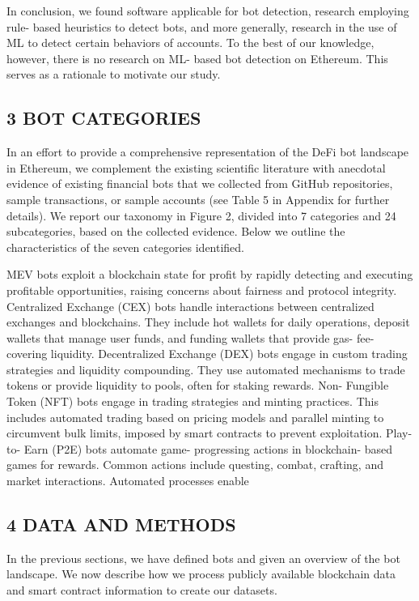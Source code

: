 In conclusion, we found software applicable for bot detection, research employing rule- based heuristics to detect bots, and more generally, research in the use of ML to detect certain behaviors of accounts. To the best of our knowledge, however, there is no research on ML- based bot detection on Ethereum. This serves as a rationale to motivate our study.

\subsection*{3 BOT CATEGORIES}

In an effort to provide a comprehensive representation of the DeFi bot landscape in Ethereum, we complement the existing scientific literature with anecdotal evidence of existing financial bots that we collected from GitHub repositories, sample transactions, or sample accounts (see Table 5 in Appendix for further details). We report our taxonomy in Figure 2, divided into 7 categories and 24 subcategories, based on the collected evidence. Below we outline the characteristics of the seven categories identified.

MEV bots exploit a blockchain state for profit by rapidly detecting and executing profitable opportunities, raising concerns about fairness and protocol integrity. Centralized Exchange (CEX) bots handle interactions between centralized exchanges and blockchains. They include hot wallets for daily operations, deposit wallets that manage user funds, and funding wallets that provide gas- fee- covering liquidity. Decentralized Exchange (DEX) bots engage in custom trading strategies and liquidity compounding. They use automated mechanisms to trade tokens or provide liquidity to pools, often for staking rewards. Non- Fungible Token (NFT) bots engage in trading strategies and minting practices. This includes automated trading based on pricing models and parallel minting to circumvent bulk limits, imposed by smart contracts to prevent exploitation. Play- to- Earn (P2E) bots automate game- progressing actions in blockchain- based games for rewards. Common actions include questing, combat, crafting, and market interactions. Automated processes enable

\subsection*{4 DATA AND METHODS}

In the previous sections, we have defined bots and given an overview of the bot landscape. We now describe how we process publicly available blockchain data and smart contract information to create our datasets.

